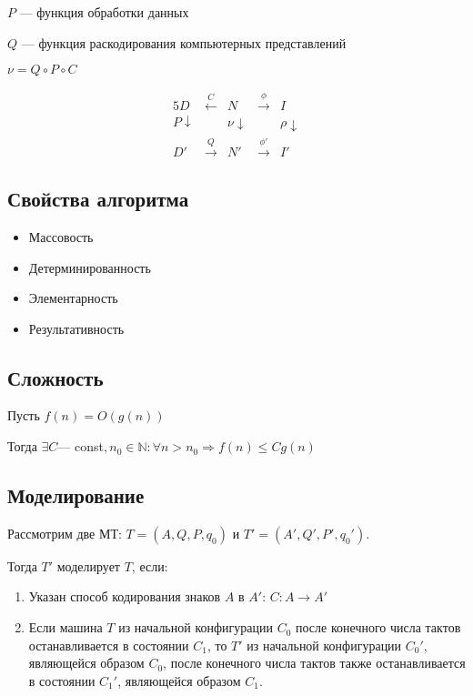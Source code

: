 \documentclass{article}
\begin{document}
$P$ --- функция обработки данных

$Q$ --- функция раскодирования компьютерных представлений

$\nu = Q \circ P \circ C$

\begin{alignat*}{5}
	D & \stackrel{C}{\longleftarrow} & N & \stackrel{\phi}{\longrightarrow} & I \\
	P \downarrow & & \nu \downarrow & & \rho \downarrow \\
	D' & \stackrel{Q}{\longrightarrow} & N' & \stackrel{\phi'}{\longrightarrow} & I'
\end{alignat*}

\subsection{Свойства алгоритма}

\begin{itemize}
	\item Массовость
	\item Детерминированность
	\item Элементарность
	\item Результативность
\end{itemize}

\subsection{Сложность}

Пусть $f(n) = O(g(n))$

Тогда $\exists C$--- const$, n_0 \in \mathbb{N} : \forall n > n_0 \Rightarrow f(n) \le C g(n)$

\subsection{Моделирование}

Рассмотрим две МТ: $T = (A, Q, P, q_0)$ и $T' = (A', Q', P', q_0')$.

Тогда $T'$ моделирует $T$, если:

\begin{enumerate}
	\item Указан способ кодирования знаков $A$ в $A'$: $C: A \rightarrow A'$
	\item Если машина $T$ из начальной конфигурации $C_0$ после конечного числа тактов
	останавливается в состоянии $C_1$, то $T'$ из начальной конфигурации $C_0'$, являющейся образом $C_0$, 
	после конечного числа тактов также останавливается в состоянии $C_1'$, являющейся образом $C_1$.
\end{enumerate}
\end{document}
